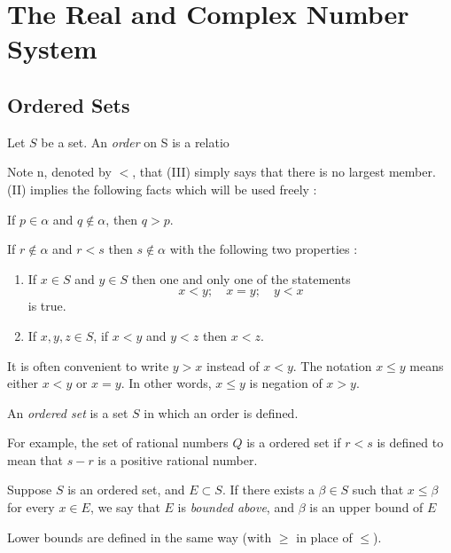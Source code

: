 

\chapter{The Real and Complex Number System}

\bigbreak
\section{Ordered Sets}

\begin{defn}
    \label{ords}
    Let $S$ be a set. An {\it order} on S is a relatio
    
    Note n, denoted by $<$, that (III) simply says that there is no largest member.
    (II) implies the following facts which will be used freely : 

    If $p \in \alpha$ and $q \notin \alpha$, then $q > p$.

    If $r \notin \alpha$ and $r < s$ then $s \notin \alpha$
    with the following two properties : 
    \begin{enumerate}
        \item If $x \in S$ and $y \in S$ then one and only one of the statements
            $$ x < y ; \quad x = y ; \quad y < x $$
            is true.
        \item If $x, y, z \in S$, if $x < y$ and $y < z$ then $x < z$.
    \end{enumerate}
    It is often convenient to write $y > x$ instead of $x < y$.
    The notation $x \leq y$ means either $x < y$ or  $x = y$. 
    In other words, $x \leq y$ is negation of $x > y$.
\end{defn}

\begin{defn}
    An {\it ordered set} is a set $S$ in which an order is defined.
\end{defn}
For example, the set of rational numbers $Q$ is a ordered set if $r < s$ 
is defined to mean that $s-r$ is a positive rational number.

\begin{defn}
    Suppose $S$ is an ordered set, and $E \subset S$. 
    If there exists a $\beta \in S$ such that $x \leq \beta$ for every $x \in E$, 
    we say that $E$ is {\it bounded above},
    and $\beta$ is an upper bound of $E$
\end{defn}
Lower bounds are defined in the same way (with $\geq$ in place of $\leq$).

